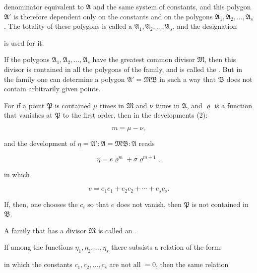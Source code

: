 
denominator equivalent to $\mathfrak{A}$ and the same system of constants, and this polygon $\mathfrak{A}'$ is
therefore dependent only on the constants and on the polygons
$\mathfrak{A}_1, \mathfrak{A}_2, \ldots, \mathfrak{A}_s$. The totality of these polygons is called a
 $\mathfrak{A}_1, \mathfrak{A}_2, \ldots, \mathfrak{A}_s$,
and the designation


is used for it.

If the polygons $\mathfrak{A}_1, \mathfrak{A}_2, \ldots, \mathfrak{A}_s$ have the greatest common
 divisor $\mathfrak{M}$, then this divisor is contained in all the polygons
of the family, and is called the . But
in the family one can determine a polygon $\mathfrak{A}' = \mathfrak{M}\mathfrak{B}$ in such a way
that $\mathfrak{B}$ does not contain arbitrarily given points.

For if a point $\mathfrak{P}$ is contained $\mu$ times in $\mathfrak{M}$ and $\nu$ times in $\mathfrak{A}$,
and $\varrho$ is a function that vanishes at $\mathfrak{P}$ to the first order,
then in the developments (2):

\[
m = \mu - \nu,
\]

and the development of $\eta = \mathfrak{A}' : \mathfrak{A} = \mathfrak{M}\mathfrak{B} : \mathfrak{A}$ reads

\[
\eta = e\varrho^m + \sigma\varrho^{m+1},
\]

in which

\[
e = e_1c_1 + e_2c_2 + \cdots + e_sc_s.
\]

If, then, one chooses the $c_i$ so that $e$ does not vanish, then
$\mathfrak{P}$ is not contained in $\mathfrak{B}$.

A family that has a divisor $\mathfrak{M}$ is called an .

If among the functions $\eta_1, \eta_2, \ldots, \eta_s$ there subsists a relation
of the form:


in which the constants $c_1, c_2, \ldots, c_s$ are not all $= 0$, then the
 same relation


